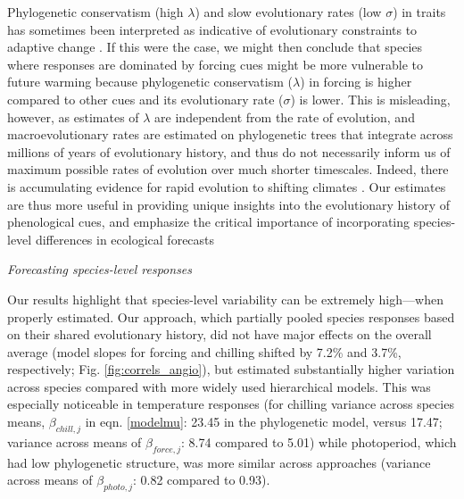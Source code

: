 \documentclass[11pt]{article}
\begin{document}
Phylogenetic conservatism (high $\lambda$) and slow evolutionary rates (low $\sigma$) in traits has sometimes been interpreted as indicative of evolutionary constraints to adaptive change \citep{wiens2010niche,bennett2021evolution}. If this were the case, we might then conclude that species where responses are dominated by forcing cues might be more vulnerable to future warming because phylogenetic conservatism ($\lambda$) in forcing is higher compared to other cues and its evolutionary rate ($\sigma$) is lower. This is misleading, however, as estimates of $\lambda$ are independent from the rate of evolution, and macroevolutionary rates are estimated on phylogenetic trees that integrate across millions of years of evolutionary history, and thus do not necessarily inform us of maximum possible rates of evolution over much shorter timescales. Indeed, there is accumulating evidence for rapid evolution to shifting climates \citep{bradshaw2006,franks2014}. Our estimates are thus more useful in providing unique insights into the evolutionary history of phenological cues, and emphasize the critical importance of incorporating species-level differences in ecological forecasts


\emph{Forecasting species-level responses}

Our results highlight that species-level variability can be extremely high---when properly estimated. Our approach, which partially pooled species responses based on their shared evolutionary history, did not have major effects on the overall average (model slopes for forcing and chilling shifted by 7.2\% and 3.7\%, respectively; Fig. \ref{fig:correls_angio}), but estimated substantially higher variation across species compared with more widely used hierarchical models. This was especially noticeable in temperature responses (for chilling variance across species means, $\beta_{chill,j}$ in eqn. \ref{modelmu}: 23.45 in the phylogenetic model, versus 17.47; variance across means of $\beta_{force,j}$: 8.74 compared to 5.01) while photoperiod, which had low phylogenetic structure, was more similar across approaches (variance across means of $\beta_{photo,j}$: 0.82 compared to 0.93). %
\end{document}
